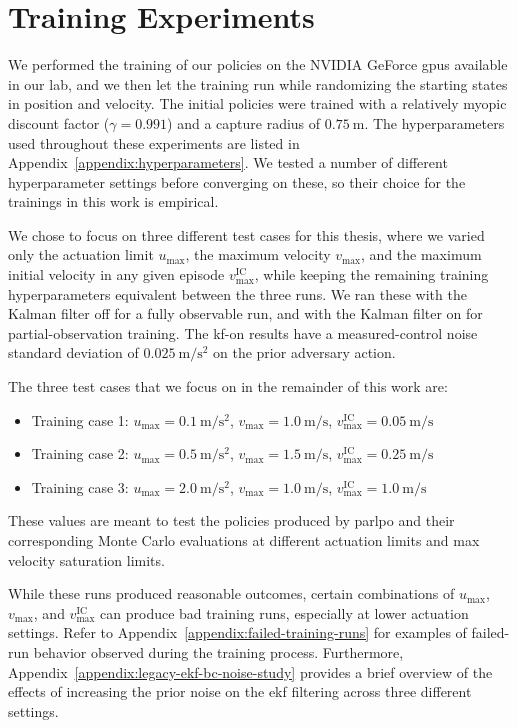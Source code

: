 \chapter{Training Experiments}


We performed the training of our policies on the NVIDIA GeForce \acs{gpu}s available in our lab, and we then let the training run while randomizing the starting states in position and velocity. The initial policies were trained with a relatively myopic discount factor ($\gamma = 0.991$) and a capture radius of $0.75~\mathrm{m}$. The hyperparameters used throughout these experiments are listed in Appendix~\ref{appendix:hyperparameters}. We tested a number of different hyperparameter settings before converging on these, so their choice for the trainings in this work is empirical.


We chose to focus on three different test cases for this thesis, where we varied only the actuation limit $u_{\max}$, the maximum velocity $v_{\max}$, and the maximum initial velocity in any given episode $v_{\max}^{\mathrm{IC}}$, while keeping the remaining training hyperparameters equivalent between the three runs. We ran these with the Kalman filter off for a fully observable run, and with the Kalman filter on for partial-observation training. The \acs{kf}-on results have a measured-control noise standard deviation of $0.025~\mathrm{m/s^2}$ on the prior adversary action.

The three test cases that we focus on in the remainder of this work are:


\begin{itemize}
    \item Training case 1: $u_{\max} = 0.1~\mathrm{m/s^2}$, $v_{\max} = 1.0~\mathrm{m/s}$, $v_{\max}^{\mathrm{IC}} = 0.05~\mathrm{m/s}$
    \item Training case 2: $u_{\max} = 0.5~\mathrm{m/s^2}$, $v_{\max} = 1.5~\mathrm{m/s}$, $v_{\max}^{\mathrm{IC}} = 0.25~\mathrm{m/s}$
    \item Training case 3: $u_{\max} = 2.0~\mathrm{m/s^2}$, $v_{\max} = 1.0~\mathrm{m/s}$, $v_{\max}^{\mathrm{IC}} = 1.0~\mathrm{m/s}$
\end{itemize}

These values are meant to test the policies produced by \acs{parlpo} and their corresponding Monte Carlo evaluations at different actuation limits and max velocity saturation limits. 

While these runs produced reasonable outcomes, certain combinations of $u_{\max}$, $v_{\max}$, and $v_{\max}^{\mathrm{IC}}$ can produce bad training runs, especially at lower actuation settings. Refer to Appendix~\ref{appendix:failed-training-runs} for examples of failed-run behavior observed during the training process. Furthermore, Appendix~\ref{appendix:legacy-ekf-bc-noise-study} provides a brief overview of the effects of increasing the prior noise on the \acs{ekf} filtering across three different settings.


